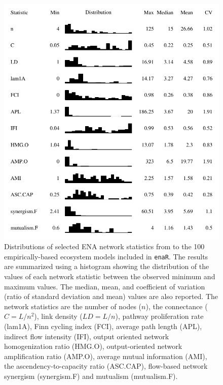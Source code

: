 \documentclass[11pt]{article}
\newcommand{\enaR}{\texttt{enaR}}
\begin{document}
\begin{figure}[t]
\includegraphics[scale=1]{../figures/ns_dist.pdf}
\caption{Distributions of selected ENA network statistics from to the
  100 empirically-based ecosystem models included in \enaR.  The
  results are summarized using a histogram showing the distribution of
  the values of each network statistic between the observed minimum
  and maximum values.  The median, mean, and coefficient of variation
  (ratio of standard deviation and mean) values are also reported.
  The network statistics are the number of nodes ($n$), the
  connectance ($C = L/n^2$), link density ($LD = L/n$), pathway
  proliferation rate (lam1A), Finn cycling index (FCI), average path
  length (APL), indirect flow intensity (IFI), output oriented network
  homogenization ratio (HMG.O), output-oriented network amplification
  ratio (AMP.O), average mutual information (AMI), the
  ascendency-to-capacity ratio (ASC.CAP), flow-based network synergism
  (synergism.F) and mutualism (mutualism.F).} \label{fig:ns}
\end{figure}
\end{document}

